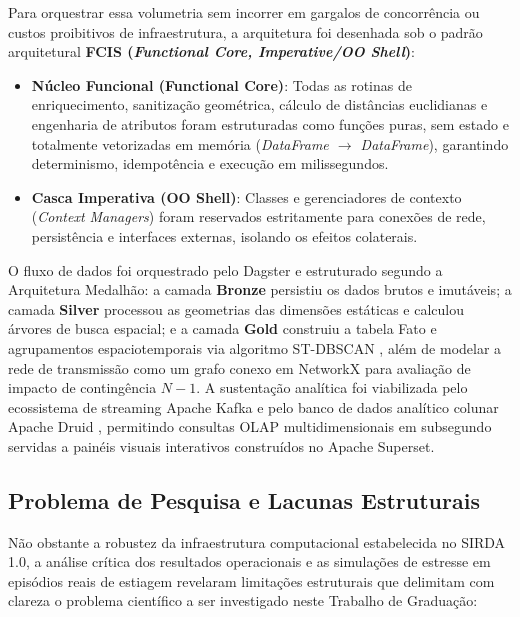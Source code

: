 Para orquestrar essa volumetria sem incorrer em gargalos de concorrência ou custos proibitivos de infraestrutura, a arquitetura foi desenhada sob o padrão arquitetural \textbf{FCIS (\textit{Functional Core, Imperative/OO Shell})}:
\begin{itemize}
    \item \textbf{Núcleo Funcional (Functional Core)}: Todas as rotinas de enriquecimento, sanitização geométrica, cálculo de distâncias euclidianas e engenharia de atributos foram estruturadas como funções puras, sem estado e totalmente vetorizadas em memória (\textit{DataFrame $\rightarrow$ DataFrame}), garantindo determinismo, idempotência e execução em milissegundos.
    \item \textbf{Casca Imperativa (OO Shell)}: Classes e gerenciadores de contexto (\textit{Context Managers}) foram reservados estritamente para conexões de rede, persistência e interfaces externas, isolando os efeitos colaterais.
\end{itemize}

O fluxo de dados foi orquestrado pelo Dagster e estruturado segundo a Arquitetura Medalhão: a camada \textbf{Bronze} persistiu os dados brutos e imutáveis; a camada \textbf{Silver} processou as geometrias das dimensões estáticas e calculou árvores de busca espacial; e a camada \textbf{Gold} construiu a tabela Fato e agrupamentos espaciotemporais via algoritmo ST-DBSCAN \cite{ester1996density}, além de modelar a rede de transmissão como um grafo conexo em NetworkX \cite{hagberg2008exploring} para avaliação de impacto de contingência $N-1$. A sustentação analítica foi viabilizada pelo ecossistema de streaming Apache Kafka \cite{kreps2011kafka} e pelo banco de dados analítico colunar Apache Druid \cite{yang2014druid}, permitindo consultas OLAP multidimensionais em subsegundo servidas a painéis visuais interativos construídos no Apache Superset.

\subsection{Problema de Pesquisa e Lacunas Estruturais}
\label{sbc:problema_pesquisa}

Não obstante a robustez da infraestrutura computacional estabelecida no SIRDA 1.0, a análise crítica dos resultados operacionais e as simulações de estresse em episódios reais de estiagem revelaram limitações estruturais que delimitam com clareza o problema científico a ser investigado neste Trabalho de Graduação:

